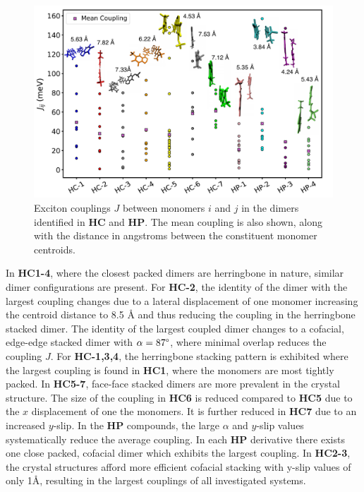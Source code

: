 \begin{figure}
\centering
  \includegraphics[width=0.9\linewidth]{5ConnectingCrystalStructure/couplings}
  \caption[Exciton couplings in \textbf{HC} and \textbf{HP} systems]{Exciton couplings $J$ between monomers $i$ and $j$ in the dimers identified in \textbf{HC} and \textbf{HP}. The mean coupling is also shown, along with the distance in angstroms between the constituent monomer centroids.}
  \label{figure: couplings}
\end{figure}

In \textbf{HC1-4}, where the closest packed dimers are herringbone in nature, similar dimer configurations are present. For \textbf{HC-2}, the identity of the dimer with the largest coupling changes due to a lateral displacement of one monomer increasing the centroid distance to 8.5 {\AA} and thus reducing the coupling in the herringbone stacked dimer. The identity of the largest coupled dimer changes to a cofacial, edge-edge stacked dimer with $\alpha=87\degree$, where minimal overlap reduces the coupling $J$. For \textbf{HC-1,3,4}, the herringbone stacking pattern is exhibited where the largest coupling is found in \textbf{HC1}, where the monomers are most tightly packed. In \textbf{HC5-7}, face-face stacked dimers are more prevalent in the crystal structure. The size of the coupling in \textbf{HC6} is reduced compared to \textbf{HC5} due to the $x$ displacement of one the monomers. It is further reduced in \textbf{HC7} due to an increased $y$-slip. In the \textbf{HP} compounds, the large $\alpha$ and $y$-slip values systematically reduce the average coupling. In each \textbf{HP} derivative there exists one close packed, cofacial dimer which exhibits the largest coupling. In \textbf{HC2-3}, the crystal structures afford more efficient cofacial stacking with y-slip values of only 1{\AA}, resulting in the largest couplings of all investigated systems. 

